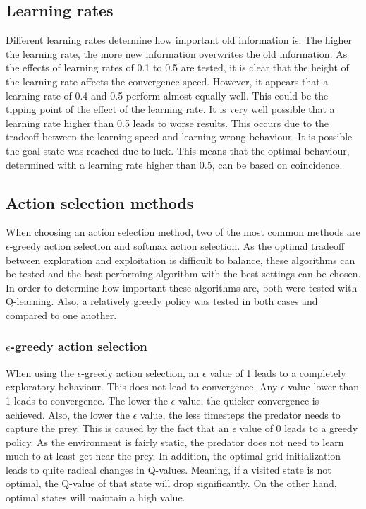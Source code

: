 \documentclass{article}
\begin{document}
\subsection{Learning rates}
Different learning rates determine how important old information is. The higher the learning rate, the more new information overwrites the old information. As the effects of learning rates of 0.1 to 0.5 are tested, it is clear that the height of the learning rate affects the convergence speed. However, it appears that a learning rate of 0.4 and 0.5 perform almost equally well. This could be the tipping point of the effect of the learning rate. It is very well possible that a learning rate higher than 0.5 leads to worse results. This occurs due to the tradeoff between the learning speed and learning wrong behaviour. It is possible the goal state was reached due to luck. This means that the optimal behaviour, determined with a learning rate higher than 0.5, can be based on coincidence. 

\subsection{Action selection methods}
When choosing an action selection method, two of the most common methods are $\epsilon$-greedy action selection and softmax action selection. As the optimal tradeoff between exploration and exploitation is difficult to balance, these algorithms can be tested and the best performing algorithm with the best settings can be chosen. In order to determine how important these algorithms are, both were tested with Q-learning. Also, a relatively greedy policy was tested in both cases and compared to one another. 

\subsubsection{$\epsilon$-greedy action selection}
When using the $\epsilon$-greedy action selection, an $\epsilon$ value of 1 leads to a completely exploratory behaviour. This does not lead to convergence. Any $\epsilon$ value lower than 1 leads to convergence. The lower the $\epsilon$ value, the quicker convergence is achieved. Also, the lower the $\epsilon$ value, the less timesteps the predator needs to capture the prey. This is caused by the fact that an $\epsilon$ value of 0 leads to a greedy policy.	As the environment is fairly static, the predator does not need to learn much to at least get near the prey. In addition, the optimal grid initialization leads to quite radical changes in Q-values. Meaning, if a visited state is not optimal, the Q-value of that state will drop significantly. On the other hand, optimal states will maintain a high value. 
\end{document}
